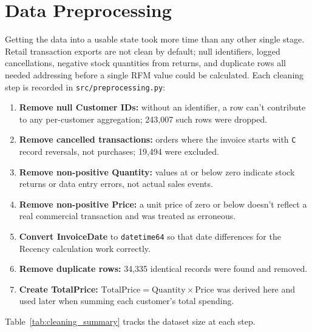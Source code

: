 \documentclass[12pt, a4paper]{article}
\begin{document}
\section{Data Preprocessing}\label{sec:preprocessing}

Getting the data into a usable state took more time than any other single stage. Retail transaction exports are not clean by default; null identifiers, logged cancellations, negative stock quantities from returns, and duplicate rows all needed addressing before a single RFM value could be calculated. Each cleaning step is recorded in \texttt{src/preprocessing.py}:

\begin{enumerate}[nosep]
    \item \textbf{Remove null Customer IDs:} without an identifier, a row can't contribute to any per-customer aggregation; 243,007 such rows were dropped.
    \item \textbf{Remove cancelled transactions:} orders where the invoice starts with \texttt{C} record reversals, not purchases; 19,494 were excluded.
    \item \textbf{Remove non-positive Quantity:} values at or below zero indicate stock returns or data entry errors, not actual sales events.
    \item \textbf{Remove non-positive Price:} a unit price of zero or below doesn't reflect a real commercial transaction and was treated as erroneous.
    \item \textbf{Convert InvoiceDate} to \texttt{datetime64} so that date differences for the Recency calculation work correctly.
    \item \textbf{Remove duplicate rows:} 34,335 identical records were found and removed.
    \item \textbf{Create TotalPrice:} $\text{TotalPrice} = \text{Quantity} \times \text{Price}$ was derived here and used later when summing each customer's total spending.
\end{enumerate}

\noindent Table~\ref{tab:cleaning_summary} tracks the dataset size at each step.
\end{document}

